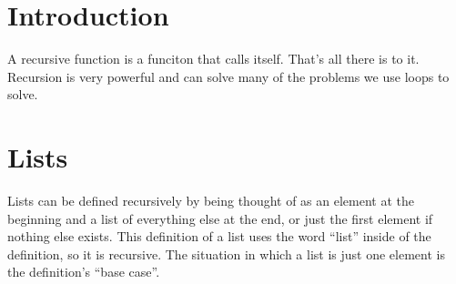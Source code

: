 \documentclass{article}
\begin{document}
\maketitle
\tableofcontents

\section{Introduction}
A recursive function is a funciton that calls itself. That's all there is to
it. Recursion is very powerful and can solve many of the problems we use loops
to solve.

\section{Lists}
Lists can be defined recursively by being thought of as an element at the
beginning and a list of everything else at the end, or just the first element
if nothing else exists. This definition of a list uses the word ``list'' inside
of the definition, so it is recursive. The situation in which a list is just
one element is the definition's ``base case''.
\end{document}

